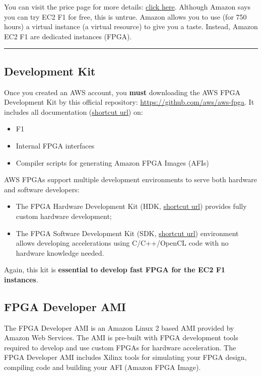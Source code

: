 \documentclass[a4paper]{article}
\newcommand{\longline}{\noindent\rule{\textwidth}{0.4pt}}
\begin{document}
    \noindent
    You can visit the price page for more details: \href{https://aws.amazon.com/ec2/pricing/}{click here}. Although Amazon says you can try EC2 F1 for free, this is untrue. Amazon allows you to use (for 750 hours) a virtual instance (a virtual resource) to give you a taste. Instead, Amazon EC2 F1 are dedicated instances (FPGA).

    \longline

    \subsection{Development Kit}\label{sec: development kit}

    Once you created an AWS account, you \textbf{must} downloading the AWS FPGA Development Kit by this official repository: \url{https://github.com/aws/aws-fpga}. It includes all documentation (\href{https://github.com/aws/aws-fpga#documentation-overview}{shortcut url}) on:
    \begin{itemize}
        \item F1
        \item Internal FPGA interfaces
        \item Compiler scripts for generating Amazon FPGA Images (AFIs)
    \end{itemize}
    
    \noindent
    AWS FPGAs support multiple development environments to serve both hardware and software developers:
    \begin{itemize}
        \item The FPGA Hardware Development Kit (HDK, \href{https://github.com/aws/aws-fpga#hardware-development-kit-hdk}{shortcut url}) provides fully custom hardware development;

        \item The FPGA Software Development Kit (SDK, \href{https://github.com/aws/aws-fpga#runtime-tools-sdk}{shortcut url}) environment allows developing accelerations using C/C++/OpenCL code with no hardware knowledge needed.
    \end{itemize}
    Again, this kit is \textbf{essential to develop fast FPGA for the EC2 F1 instances}.\newpage

    \subsection{FPGA Developer AMI}\label{sec: FPGA Developer AMI}

    The FPGA Developer AMI is an Amazon Linux 2 based AMI provided by Amazon Web Services. The AMI is pre-built with FPGA development tools required to develop and use custom FPGAs for hardware acceleration. The FPGA Developer AMI includes Xilinx tools for simulating your FPGA design, compiling code and building your AFI (Amazon FPGA Image).\newline
\end{document}
